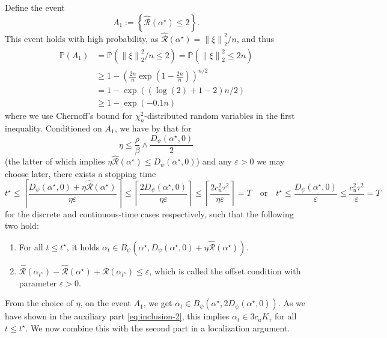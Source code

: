\documentclass[a4paper]{article}
\newcommand{\mathset}[1]{\left\{#1\right\}}
\newcommand{\pr}[1]{\left(#1\right)}
\newcommand{\norm}[1]{\left\|#1\right\|}
\newcommand{\PP}[0]{\mathbb{P}}
\newcommand{\cR}[0]{\mathcal{R}}
\newcommand{\eps}[0]{\varepsilon}
\newcommand{\tstar}{t^\star}
\newcommand{\alphastar}{\alpha^\star}
\newcommand{\alphat}[0]{\alpha_t}
\newcommand{\alphatstar}[0]{\alpha_{t^\star}}
\newcommand{\Kt}[0]{K_\tau}
\newcommand{\Rhat}[0]{\widehat{\cR}}
\theoremstyle{thmstyle}
\theoremstyle{defstyle}
\theoremstyle{remark}
\begin{document}
Define the event
\begin{equation*}
    A_1:= \mathset{\Rhat(\alphastar)\leq 2}.
\end{equation*}
This event holds with high probability, as $\Rhat(\alphastar)=\norm{\xi}_2^2/n$, and thus
\begin{align*}
    \PP\pr{A_1}&=\PP\pr{\norm{\xi}_2^2/n\leq 2} = \PP\pr{\norm{\xi}_2^2\leq 2n} \\
    &\geq 1-\pr{\frac{2n}{n}\exp\pr{1-\frac{2n}{n}}}^{n/2} \\
    &= 1-\exp\pr{\pr{\log(2)+1-2}n/2} \\
    &\geq 1-\exp\pr{-0.1 n}
\end{align*}
where we use Chernoff's bound for $\chi_n^2$-distributed random variables in the first inequality.
Conditioned on $A_1$, we have by \cite[Theorems 2 and 3]{Kanade2023earlystopped} that for
\begin{equation*}
    \eta\leq \frac{\rho}{\beta} \wedge \frac{ D_{\psi}(\alphastar,0)}{2}
\end{equation*}
(the latter of which implies $\eta \Rhat(\alphastar)\leq D_\psi(\alphastar,0)$)
and any $\eps>0$ we may choose later, there exists a stopping time 
\begin{equation*}
    t^\star\leq \left\lceil\frac{D_\psi(\alphastar,0)+\eta \Rhat(\alphastar)}{\eta\eps}\right\rceil \leq \left\lceil\frac{2D_\psi(\alphastar,0)}{\eta\eps}\right\rceil \leq \left\lceil\frac{2c_u^2\tau^2}{\eta\eps}\right\rceil=T \quad \text{or} \quad t^\star\leq \frac{D_\psi(\alphastar,0)}{\eps}\leq \frac{c_u^2\tau^2}{\eps}=T
\end{equation*}
for the discrete and continuous-time cases respectively, such that the following two hold:
\begin{enumerate}
    \item For all $t\leq \tstar$, it holds $\alphat\in B_{\psi}(\alphastar,D_\psi(\alphastar,0)+\eta \Rhat(\alphastar))$. 
    \item $\Rhat(\alphatstar)-\Rhat(\alphastar)+\cR(\alphatstar)\leq \eps$, which is called the offset condition with parameter $\eps>0$.
\end{enumerate}
From the choice of $\eta$, on the event $A_1$, we get $\alphat \in B_{\psi}(\alphastar,2D_\psi(\alphastar,0))$.
As we have shown in the auxiliary part \eqref{eq:inclusion-2}, this implies $\alpha_t\in 3c_a\Kt$ for all $t\leq t^\star$. We now combine this with the second part in a localization argument.
\end{document}
